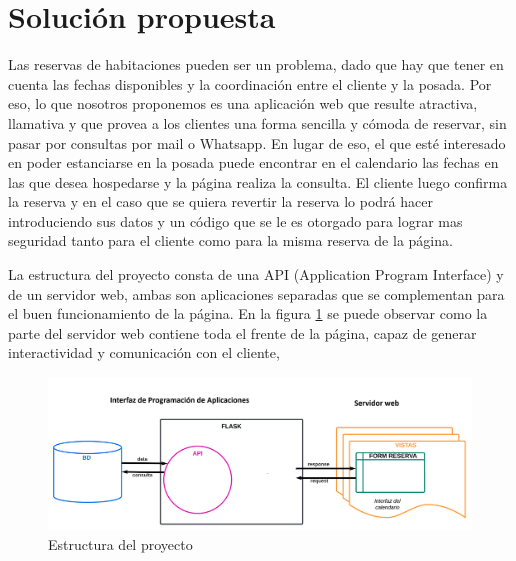 \section{Solución propuesta}

Las reservas de habitaciones pueden ser un problema, dado que hay que tener en cuenta las fechas disponibles y la coordinación entre el cliente y la posada. Por eso, lo que nosotros proponemos es una aplicación web que resulte atractiva, llamativa y que provea a los clientes una forma sencilla y cómoda de reservar, sin pasar por consultas por mail o Whatsapp. En lugar de eso, el que esté interesado en poder estanciarse en la posada puede encontrar en el calendario las fechas en las que desea hospedarse y la página realiza la consulta. El cliente luego confirma la reserva y en el caso que se quiera revertir la reserva lo podrá hacer introduciendo sus datos y un código que se le es otorgado para lograr mas seguridad tanto para el cliente como para la misma reserva de la página.

La estructura del proyecto consta de una API (Application Program Interface) y de un servidor web, ambas son aplicaciones separadas que se complementan para el buen funcionamiento de la página. En la figura \ref{fig:Est} se puede observar como la parte del servidor web contiene toda el frente de la página, capaz de generar interactividad y comunicación con el cliente, 



\begin{figure}
    \centering
    \includegraphics[width=1\linewidth]{images/Estructura_de_pagina.png}
    \caption{Estructura del proyecto}
    \label{fig:Est}
\end{figure}